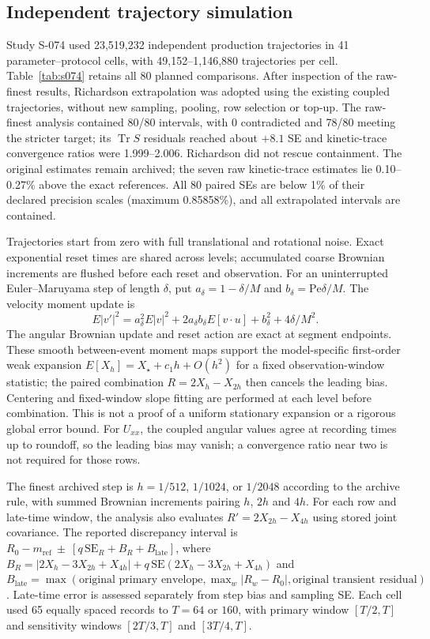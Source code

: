 \subsection{Independent trajectory simulation}\label{s0.2-s074-trajectory-method}

Study S-074 used 23,519,232 independent production trajectories in 41 parameter--protocol cells, with 49,152--1,146,880 trajectories per cell. Table~\ref{tab:s074} retains all 80 planned comparisons. After inspection of the raw-finest results, Richardson extrapolation was adopted using the existing coupled trajectories, without new sampling, pooling, row selection or top-up. The raw-finest analysis contained 80/80 intervals, with 0 contradicted and 78/80 meeting the stricter target; its $\operatorname{Tr}S$ residuals reached about $+8.1$ SE and kinetic-trace convergence ratios were 1.999--2.006. Richardson did not rescue containment. The original estimates remain archived; the seven raw kinetic-trace estimates lie 0.10--0.27\% above the exact references. All 80 paired SEs are below 1\% of their declared precision scales (maximum 0.85858\%), and all extrapolated intervals are contained.

Trajectories start from zero with full translational and rotational noise. Exact exponential reset times are shared across levels; accumulated coarse Brownian increments are flushed before each reset and observation. For an uninterrupted Euler--Maruyama step of length $\delta$, put $a_\delta=1-\delta/M$ and $b_\delta=\mathrm{Pe}\delta/M$. The velocity moment update is
\[
E|v'|^2=a_\delta^2E|v|^2+2a_\delta b_\delta E[v\cdot u]+b_\delta^2+4\delta/M^2.
\]
The angular Brownian update and reset action are exact at segment endpoints. These smooth between-event moment maps support the model-specific first-order weak expansion $E[X_h]=X_\star+c_1h+O(h^2)$ for a fixed observation-window statistic; the paired combination $R=2X_h-X_{2h}$ then cancels the leading bias. Centering and fixed-window slope fitting are performed at each level before combination. This is not a proof of a uniform stationary expansion or a rigorous global error bound. For $U_{xx}$, the coupled angular values agree at recording times up to roundoff, so the leading bias may vanish; a convergence ratio near two is not required for those rows.

The finest archived step is $h=1/512$, $1/1024$, or $1/2048$ according to the archive rule, with summed Brownian increments pairing $h$, $2h$ and $4h$. For each row and late-time window, the analysis also evaluates $R'=2X_{2h}-X_{4h}$ using stored joint covariance. The reported discrepancy interval is $R_0-m_{\mathrm{ref}}\ \mathbin{\pm}\ [q\,\mathrm{SE}_R+B_R+B_{\mathrm{late}}]$, where $B_R=|2X_h-3X_{2h}+X_{4h}|+q\,\mathrm{SE}(2X_h-3X_{2h}+X_{4h})$ and $B_{\mathrm{late}}=\max(\text{original primary envelope},\max_w|R_w-R_0|,\text{original transient residual})$. Late-time error is assessed separately from step bias and sampling SE. Each cell used 65 equally spaced records to $T=64$ or $160$, with primary window $[T/2,T]$ and sensitivity windows $[2T/3,T]$ and $[3T/4,T]$.

